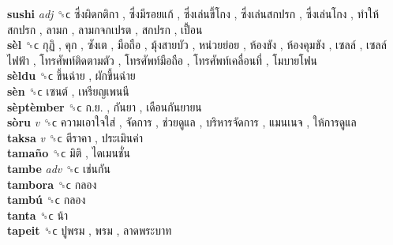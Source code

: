 \textbf{sushi} \emph{adj}  ␝ϲ   ซึ่งผิดกติกา ,  ซึ่งมีรอยแก้ ,  ซึ่งเล่นขี้โกง ,  ซึ่งเล่นสกปรก ,  ซึ่งเล่นโกง ,  ทำให้สกปรก ,  ลามก ,  ลามกจกเปรต ,  สกปรก ,  เปื้อน   \\
\textbf{sèl} ␝ϲ   กุฏิ ,  คุก ,  ซังเต ,  มือถือ ,  มุ้งสายบัว ,  หน่วยย่อย ,  ห้องขัง ,  ห้องคุมขัง ,  เซลล์ ,  เซลล์ไฟฟ้า ,  โทรศัพท์ติดตามตัว ,  โทรศัพท์มือถือ ,  โทรศัพท์เคลื่อนที่ ,  โมบายโฟน   \\
\textbf{sèldu} ␝ϲ   ขึ้นฉ่าย ,  ผักขึ้นฉ่าย   \\
\textbf{sèn} ␝ϲ   เซนต์ ,  เหรียญเพนนี   \\
\textbf{sèptèmber} ␝ϲ   ก.ย. ,  กันยา ,  เดือนกันยายน   \\
\textbf{sòru} \emph{v}  ␝ϲ   ความเอาใจใส่ ,  จัดการ ,  ช่วยดูแล ,  บริหารจัดการ ,  แมนเนจ ,  ให้การดูแล   \\
\textbf{taksa} \emph{v}  ␝ϲ   ตีราคา ,  ประเมินค่า   \\
\textbf{tamaño} ␝ϲ   มิติ ,  ไดเมนชั่น   \\
\textbf{tambe} \emph{adv}  ␝ϲ   เช่นกัน   \\
\textbf{tambora} ␝ϲ   กลอง   \\
\textbf{tambú} ␝ϲ   กลอง   \\
\textbf{tanta} ␝ϲ   น้า   \\
\textbf{tapeit} ␝ϲ   ปูพรม ,  พรม ,  ลาดพระบาท   \\
